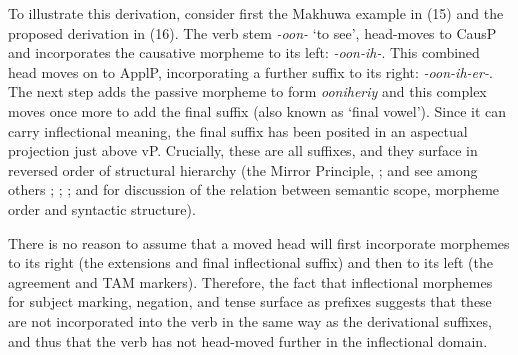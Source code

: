 \documentclass[output=paper
,modfonts
,nonflat]{langsci/langscibook}
\begin{document}
To illustrate this derivation, consider first the Makhuwa example in (15) and the proposed derivation in (16). The verb stem \textit{-oon-} ‘to see’, head-moves to CausP and incorporates the causative morpheme to its left: \textit{-oon-ih-}. This combined head moves on to ApplP, incorporating a further suffix to its right: \textit{-oon-ih-er-}. The next step adds the passive morpheme to form \textit{ooniheriy} and this complex moves once more to add the final suffix (also known as ‘final vowel’). Since it can carry inflectional meaning, the final suffix has been posited in an aspectual projection just above vP. Crucially, these are all suffixes, and they surface in reversed order of structural hierarchy (the Mirror Principle, \citealt{Baker1985, Baker1988}; and see among others \citealt{Alsina1999}; \citealt{Hyman2003}; \citealt{Good2005}; and \citealt{Muriungi2008} for discussion of the relation between semantic scope, morpheme order and syntactic structure).

\begin{figure}[!h]
\begin{exe}
\end{exe} 
\end{figure}
\newpage \noindent {}
\newpage There is no reason to assume that a moved head will first incorporate morphemes to its right (the extensions and final inflectional suffix) and then to its left (the agreement and TAM markers). Therefore, the fact that inflectional morphemes for subject marking, negation, and tense surface as prefixes suggests that these are not incorporated into the verb in the same way as the derivational suffixes, and thus that the verb has not head-moved further in the inflectional domain.
\end{document}

